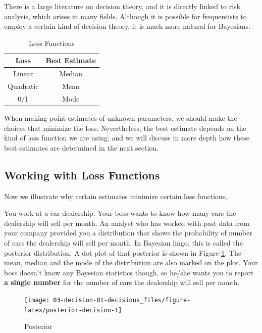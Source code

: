 \documentclass[]{book}
\theoremstyle{definition}
\theoremstyle{definition}
\theoremstyle{definition}
\theoremstyle{remark}
\let\BeginKnitrBlock\begin \let\EndKnitrBlock\end
\begin{document}
There is a large literature on decision theory, and it is directly
linked to risk analysis, which arises in many fields. Although it is
possible for frequentists to employ a certain kind of decision theory,
it is much more natural for Bayesians.

\begin{table}

\caption{\label{tab:loss-functions}Loss Functions}
\centering
\begin{tabular}[t]{cc}
\toprule
Loss & Best Estimate\\
\midrule
Linear & Median\\
Quadratic & Mean\\
0/1 & Mode\\
\bottomrule
\end{tabular}
\end{table}

When making point estimates of unknown parameters, we should make the
choices that minimize the loss. Nevertheless, the best estimate depends
on the kind of loss function we are using, and we will discuss in more
depth how these best estimates are determined in the next section.

\subsection{Working with Loss
Functions}\label{working-with-loss-functions}

Now we illustrate why certain estimates minimize certain loss functions.

\BeginKnitrBlock{example}
\protect\hypertarget{exm:car}{}\label{exm:car} You work at a car dealership.
Your boss wants to know how many cars the dealership will sell per
month. An analyst who has worked with past data from your company
provided you a distribution that shows the probability of number of cars
the dealership will sell per month. In Bayesian lingo, this is called
the posterior distribution. A dot plot of that posterior is shown in
Figure \ref{fig:posterior-decision}. The mean, median and the mode of
the distribution are also marked on the plot. Your boss doesn't know any
Bayesian statistics though, so he/she wants you to report \textbf{a
single number} for the number of cars the dealership will sell per
month.
\EndKnitrBlock{example}

\begin{figure}

{\centering \texttt{[image: 03-decision-01-decisions\_files/figure-latex/posterior-decision-1]} 

}

\caption{Posterior}\label{fig:posterior-decision}
\end{figure}
\end{document}
